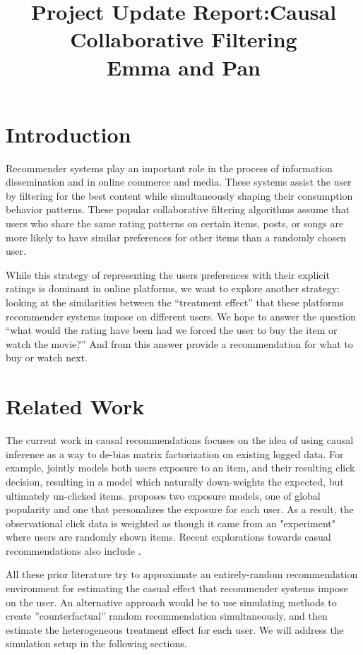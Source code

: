 \documentclass{NSF}
\begin{document}
\title{Project Update Report:Causal Collaborative Filtering\\Emma and Pan}

\section{Introduction}
Recommender systems play an important role in the process of information dissemination and in online commerce and media. These systems assist the user by filtering for the best content while simultaneously shaping their consumption behavior patterns. These popular collaborative filtering algorithms assume that users who share the same rating patterns on certain items, posts, or songs are more likely to have similar preferences for other items than a randomly chosen user. 

While this strategy of representing the users preferences with their explicit ratings is dominant in online platforms, we want to explore another strategy: looking at the similarities between the “treatment effect” that these platforms recommender systems impose on different users. We hope to answer the question “what would the rating have been had we forced the user to buy the item or watch the movie?” And from this answer provide a recommendation for what to buy or watch next.

\section{Related Work}
The current work in causal recommendations focuses on the idea of using causal inference as a way to de-bias matrix factorization on existing logged data. For example, \cite{liang2016causal} jointly models both users exposure to an item, and their resulting click decision, resulting in a model which naturally down-weights the expected, but ultimately un-clicked items. \cite{liang2016modeling} proposes two exposure models, one of global popularity and one that personalizes the exposure for each user. As a result, the observational click data is weighted as though it came from an "experiment" where users are randomly shown items. Recent explorations towards casual recommendations also include \cite{bonner2018causal,wang2018deconfounded}.

All these prior literature try to approximate an entirely-random recommendation environment for estimating the casual effect that recommender systems impose on the user. An alternative approach would be to use simulating methods to create ''counterfactual'' random recommendation simultaneously, and then estimate the heterogeneous treatment effect for each user. We will address the simulation setup in the following sections.
\end{document}
